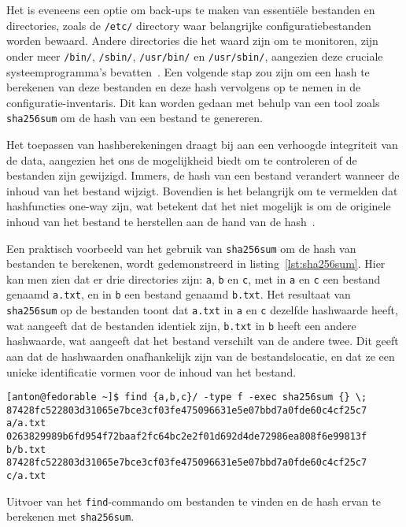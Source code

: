 Het is eveneens een optie om back-ups te maken van essenti\"ele bestanden en directories, zoals de \texttt{/etc/} directory waar belangrijke configuratiebestanden worden bewaard.
Andere directories die het waard zijn om te monitoren, zijn onder meer \texttt{/bin/}, \texttt{/sbin/}, \texttt{/usr/bin/} en \texttt{/usr/sbin/}, aangezien deze cruciale systeemprogramma's bevatten~\autocite{linuxfoundation-filesystem}.
Een volgende stap zou zijn om een hash te berekenen van deze bestanden en deze hash vervolgens op te nemen in de configuratie-inventaris.
Dit kan worden gedaan met behulp van een tool zoals \texttt{sha256sum} om de hash van een bestand te genereren.

Het toepassen van hashberekeningen draagt bij aan een verhoogde integriteit van de data, aangezien het ons de mogelijkheid biedt om te controleren of de bestanden zijn gewijzigd.
Immers, de hash van een bestand verandert wanneer de inhoud van het bestand wijzigt.
Bovendien is het belangrijk om te vermelden dat hashfuncties one-way zijn, wat betekent dat het niet mogelijk is om de originele inhoud van het bestand te herstellen aan de hand van de hash~\autocite{herrero2021file}.

Een praktisch voorbeeld van het gebruik van \texttt{sha256sum} om de hash van bestanden te berekenen, wordt gedemonstreerd in listing~\ref{lst:sha256sum}.
Hier kan men zien dat er drie directories zijn: \texttt{a}, \texttt{b} en \texttt{c}, met in \texttt{a} en \texttt{c} een bestand genaamd \texttt{a.txt}, en in \texttt{b} een bestand genaamd \texttt{b.txt}.
Het resultaat van \texttt{sha256sum} op de bestanden toont dat \texttt{a.txt} in \texttt{a} en \texttt{c} dezelfde hashwaarde heeft, wat aangeeft dat de bestanden identiek zijn, \texttt{b.txt} in \texttt{b} heeft een andere hashwaarde, wat aangeeft dat het bestand verschilt van de andere twee.
Dit geeft aan dat de hashwaarden onafhankelijk zijn van de bestandslocatie, en dat ze een unieke identificatie vormen voor de inhoud van het bestand.

\begin{listing}
  \begin{verbatim}
[anton@fedorable ~]$ find {a,b,c}/ -type f -exec sha256sum {} \;
87428fc522803d31065e7bce3cf03fe475096631e5e07bbd7a0fde60c4cf25c7  a/a.txt
0263829989b6fd954f72baaf2fc64bc2e2f01d692d4de72986ea808f6e99813f  b/b.txt
87428fc522803d31065e7bce3cf03fe475096631e5e07bbd7a0fde60c4cf25c7  c/a.txt
  \end{verbatim}
  \caption[Find-commando voor bestandshashes.]{Uitvoer van het \texttt{find}-commando om bestanden te vinden en de hash ervan te berekenen met \texttt{sha256sum}.}
  \label{lst:sha256sum}
\end{listing}

